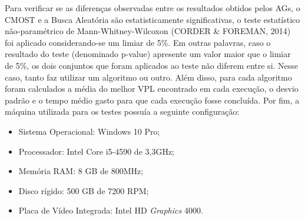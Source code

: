 Para verificar se as diferenças observadas entre os resultados obtidos pelos AGs, o CMOST e a Busca Aleatória são estatisticamente significativas, o teste estatístico não-paramétrico de Mann-Whitney-Wilcoxon (CORDER \& FOREMAN, 2014) foi aplicado considerando-se um limiar de 5\%. Em outras palavras, caso o resultado do teste (denominado p-value) apresente um valor maior que o limiar de 5\%, os dois conjuntos que foram aplicados ao teste não diferem entre si. Nesse caso, tanto faz utilizar um algoritmo ou outro. Além disso, para cada algoritmo foram calculados a média do melhor VPL encontrado em cada execução, o desvio padrão e o tempo médio gasto para que cada execução fosse concluída. Por fim, a máquina utilizada para os testes possuía a seguinte configuração:  

\begin{itemize}
\item Sistema Operacional: Windows 10 Pro;
\item Processador: Intel Core i5-4590 de 3,3GHz;
\item Memória RAM: 8 GB de 800MHz;
\item Disco rígido: 500 GB de 7200 RPM;
\item Placa de Vídeo Integrada: Intel HD \textit{Graphics} 4000.
\end{itemize}
